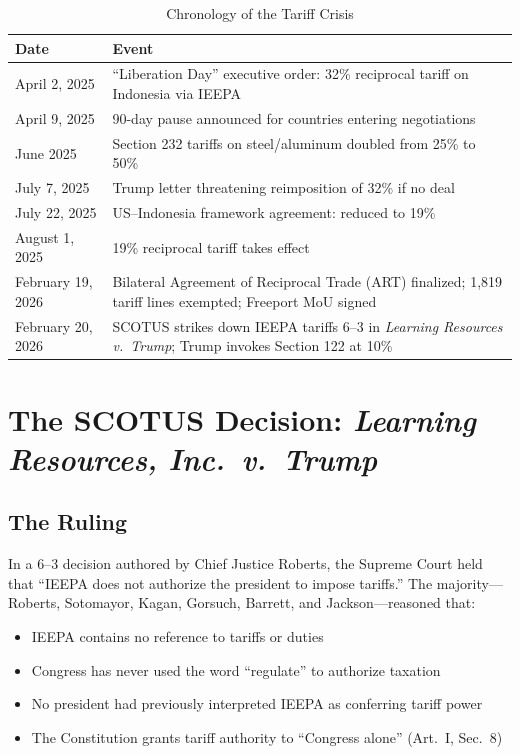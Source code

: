 \documentclass[12pt,a4paper]{article}
\begin{document}
\begin{table}[htbp]
\centering
\caption{Chronology of the Tariff Crisis}
\begin{tabularx}{\textwidth}{lX}
\toprule
\textbf{Date} & \textbf{Event} \\
\midrule
April 2, 2025 & ``Liberation Day'' executive order: 32\% reciprocal tariff on Indonesia via IEEPA \\
April 9, 2025 & 90-day pause announced for countries entering negotiations \\
June 2025 & Section 232 tariffs on steel/aluminum doubled from 25\% to 50\% \\
July 7, 2025 & Trump letter threatening reimposition of 32\% if no deal \\
July 22, 2025 & US--Indonesia framework agreement: reduced to 19\% \\
August 1, 2025 & 19\% reciprocal tariff takes effect \\
February 19, 2026 & Bilateral Agreement of Reciprocal Trade (ART) finalized; 1,819 tariff lines exempted; Freeport MoU signed \\
February 20, 2026 & SCOTUS strikes down IEEPA tariffs 6--3 in \textit{Learning Resources v.\ Trump}; Trump invokes Section 122 at 10\% \\
\bottomrule
\end{tabularx}
\end{table}

\section{The SCOTUS Decision: \textit{Learning Resources, Inc.\ v.\ Trump}}

\subsection{The Ruling}

In a 6--3 decision authored by Chief Justice Roberts, the Supreme Court held that ``IEEPA does not authorize the president to impose tariffs.'' The majority---Roberts, Sotomayor, Kagan, Gorsuch, Barrett, and Jackson---reasoned that:

\begin{itemize}
    \item IEEPA contains no reference to tariffs or duties
    \item Congress has never used the word ``regulate'' to authorize taxation
    \item No president had previously interpreted IEEPA as conferring tariff power
    \item The Constitution grants tariff authority to ``Congress alone'' (Art.\ I, Sec.\ 8)
\end{itemize}
\end{document}
